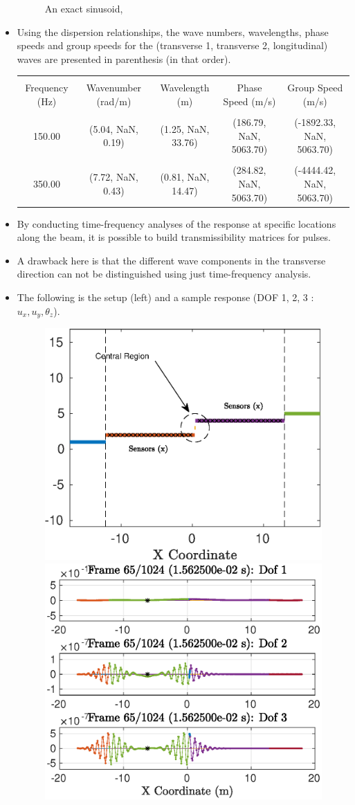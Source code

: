 \documentclass[aspectratio=169]{beamertmd}
\begin{document}
\begin{frame}[allowframebreaks]
\begin{itemize}
\begin{figure}[!h]
      \caption{An exact sinusoid, }
    \end{figure}
    \pagebreak
  \item Using the dispersion relationships, the wave numbers,
    wavelengths, phase speeds and group speeds for the (transverse 1,
    transverse 2, longitudinal) waves are presented in parenthesis (in
    that order).
    \begin{table}[!h]
      \centering
      {\tiny
        \begin{tabular}{ccccc}
          \hline\hline\\
          Frequency (Hz) & Wavenumber (rad/m) & Wavelength (m) & Phase Speed (m/s) & Group Speed (m/s)\\\hline\\
          150.00 & (5.04, NaN, 0.19) &  (1.25, NaN, 33.76) &  (186.79, NaN, 5063.70) & (-1892.33, NaN, 5063.70)\\\\
          350.00 & (7.72, NaN, 0.43) &  (0.81, NaN, 14.47) & (284.82, NaN, 5063.70) &  (-4444.42, NaN, 5063.70)\\\hline\hline
        \end{tabular}}
    \end{table}
  \item By conducting time-frequency analyses of the response at
    specific locations along the beam, it is possible to build
    transmissibility matrices for pulses.
  \item A drawback here is that the different wave components in the
    transverse direction can not be distinguished using just
    time-frequency analysis.
    \pagebreak
  \item The following is the setup (left) and a sample response (DOF 1, 2, 3
    : $u_x, u_y, \theta_z$). 
    \begin{figure}
      \centering
      \includegraphics[width=0.5\linewidth]{../../PLANARMODEL/FIGS/FPULS_setupsamp}%
      \includegraphics[width=0.5\linewidth]{../../PLANARMODEL/FIGS/FPULSERESP_samp}

\end{figure}
\end{itemize}
\end{frame}
\end{document}
